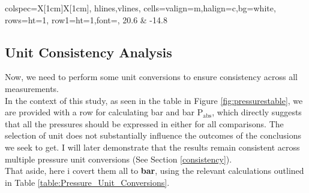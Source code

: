 \documentclass{article}
\newcounter{dataset}
\newenvironment{datasetbox}[2]{
	\refstepcounter{dataset}
	\begin{tcolorbox}[
		title={\color{black}\textbf{Dataset \thedataset: #1}},
		colback=black!4!white,
		colframe=black!10!white,
		boxrule=0.5mm,
		width=\textwidth,
		label={#2}]
	}{\end{tcolorbox}}
\begin{document}
\begin{minipage}{1.1\textwidth}
\begin{datasetbox}{Calibrated Data}{data:zero}
\begin{minipage}{0.75\textwidth}
\begin{tcolorbox}[
			title={\color{black}\normalsize \textbf{Pressure measuring instruments}},
			colback=MetallicSunburst!6!white, 
			colframe=ChineseGold!10!white, 
			boxrule=0.5mm, 
			width=1\textwidth
			]
\begin{minipage}{1.03\textwidth}
\begin{minipage}{0.22\textwidth}
\begin{tblr}{
							colspec={X[1cm]X[1cm]},
							hlines,vlines,
							cells={valign=m,halign=c,bg=white},
							rows={ht=1\baselineskip},
							row{1}={ht=1\baselineskip,font=\bfseries},
						}
						20.6 & -14.8 \\
					\end{tblr}
				\end{minipage}
			\end{minipage}		
		\end{tcolorbox}		
	\end{minipage}
\end{datasetbox}
	\end{minipage}
	
\newpage{}
\subsection{Unit Consistency Analysis}
Now, we need to perform some unit conversions to ensure consistency across all measurements.\\[8pt]
In the context of this study, as seen in the table in Figure \ref{fig:pressurestable}, we are provided with a row for calculating bar and bar \(\text{P}_\text{abs}\), which directly suggests that all the pressures should be expressed in either for all comparisons. The selection of unit does not substantially influence the outcomes of the conclusions we seek to get. I will later demonstrate that the results remain consistent across multiple pressure unit conversions (See Section \ref{consistency}).\\[8pt]
That aside, here i covert them all to \textbf{bar}, using the relevant calculations outlined in Table \ref{table:Pressure_Unit_Conversions}.
\end{document}
